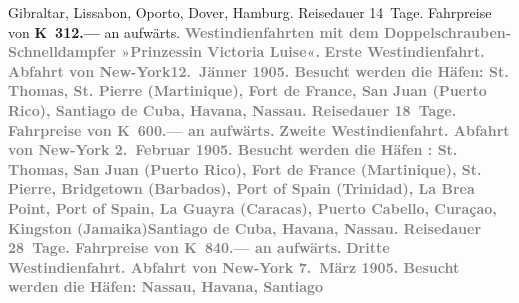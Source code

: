 \begin{ledgroupsized}[t]{13cm}
{{                     Gibraltar, Lissabon, Oporto, Dover, Hamburg. Reisedauer
                  14 Tage. Fahrpreise von \textbf{K 312.—} an aufwärts.}}\pend
           {\bigskip}\pstart
           \noindent{}\centering{}\textcolor{gray}{\textbf{Westindienfahrten mit dem Doppelschrauben-Schnelldampfer
                  »Prinzessin Victoria Luise«.}}\pend
           \pstart
           \noindent{}\textcolor{gray}{\textbf{\textbf{Erste Westindienfahrt.} Abfahrt von New-York\textbf{12. Jänner 1905}. Besucht werden die Häfen: St. Thomas,
                     St. Pierre (Martinique), Fort de France, San Juan
                     (Puerto Rico), Santiago de Cuba, Havana, Nassau. Reisedauer 18 Tage. Fahrpreise von \textbf{K 600.—}
                  an aufwärts.}}\pend
           \pstart
           \textcolor{gray}{\textbf{\textbf{Zweite Westindienfahrt.} Abfahrt von New-York { }\textbf{2. Februar 1905}. Besucht werden die Häfen : St. Thomas,
                     San Juan (Puerto Rico), Fort de France (Martinique), St. Pierre, Bridgetown (Barbados), Port of Spain (Trinidad), La Brea Point, Port of
                     Spain, La Guayra (Caracas), Puerto Cabello, Curaçao, Kingston (Jamaika)Santiago de Cuba, Havana, Nassau. Reisedauer 28 Tage.
                  Fahrpreise von \textbf{K 840.—} an aufwärts.}}\pend
           \pstart
           \textcolor{gray}{\textbf{\textbf{Dritte Westindienfahrt.} Abfahrt von New-York { }\textbf{7. März 1905}. Besucht werden die Häfen: Nassau, Havana, Santiago
}}
\end{ledgroupsized}
